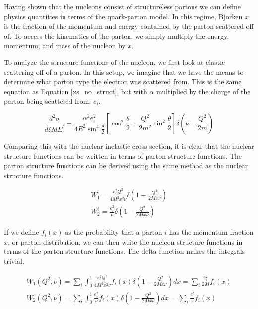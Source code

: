 
Having shown that the nucleons consist of structureless partons we can define physics quantities in terms of the quark-parton model. In this regime, Bjorken $x$ is the fraction of the momentum and energy contained by the parton scattered off of. To access the kinematics of the parton, we simply multiply the energy, momentum, and mass of the nucleon by $x$.

To analyze the structure functions of the nucleon, we first look at elastic scattering off of a parton. In this setup, we imagine that we have the means to determine what parton type the electron was scattered from. This is the same equation as Equation \ref{xs_no_struct}, but with $\alpha$ multiplied by the charge of the parton being scattered from, $e_i$.

\begin{equation}
	\frac{d^2\sigma}{d\Omega dE^\prime} = \frac{\alpha^{2}e_{i}^{2}}{4E^{2}\sin^{4}\frac{\theta}{2}} \left[\cos^{2}\frac{\theta}{2} + \frac{Q^2}{2m^2}\sin^{2}\frac{\theta}{2}\right] \delta\left(\nu-\frac{Q^2}{2m}\right)
\end{equation}

Comparing this with the nuclear inelastic cross section, it is clear that the nuclear structure functions can be written in terms of parton structure functions. The parton structure functions can be derived using the same method as the nuclear structure functions.

\begin{subequations}
\begin{align}
	W_1^i = \frac{e_{i}^{2}Q^2}{4M^{2}x^{2}\nu}\delta\left(1-\frac{Q^2}{2Mx\nu}\right) \\
	W_2^i = \frac{e_{i}^{2}}{\nu}\delta\left(1-\frac{Q^2}{2Mx\nu}\right)
\end{align}
\end{subequations}

If we define $f_{i}\left(x\right)$ as the probability that a parton $i$ has the momentum fraction $x$, or parton distribution, we can then write the nucleon structure functions in terms of the parton structure functions. The delta function makes the integrals trivial.

\begin{subequations}
\begin{align}
	W_{1}\left(Q^{2},\nu\right) = \sum_{i}\int_0^1 \frac{e_{i}^{2}Q^2}{4M^{2}x^{2}\nu}f_{i}\left(x\right)\delta\left(1-\frac{Q^2}{2Mx\nu}\right) dx = \sum_{i} \frac{e_{i}^{2}}{2M}f_{i}\left(x\right) \\
	W_{2}\left(Q^{2},\nu\right) = \sum_{i}\int_0^1 \frac{e_{i}^{2}}{\nu}f_{i}\left(x\right)\delta\left(1-\frac{Q^2}{2Mx\nu}\right) dx = \sum_{i} \frac{e_{i}^{2}}{\nu}f_{i}\left(x\right)
\end{align}
\end{subequations}

